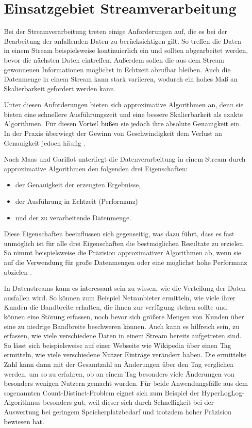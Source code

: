 \section{Einsatzgebiet Streamverarbeitung}
Bei der Streamverarbeitung treten einige Anforderungen auf, 
die es bei der Bearbeitung der anfallenden Daten zu berücksichtigen gilt. 
So treffen die Daten in einem Stream beispielsweise kontinuierlich ein 
und sollten abgearbeitet werden, bevor die nächsten Daten eintreffen. 
Außerdem sollen die aus dem Stream gewonnenen Informationen möglichst in Echtzeit abrufbar bleiben.
Auch die Datenmenge in einem Stream kann stark variieren, wodurch ein hohes Maß an Skalierbarkeit gefordert werden kann.

Unter diesen Anforderungen bieten sich approximative Algorithmen an, denn sie bieten eine schnellere Ausführungszeit und eine bessere Skalierbarkeit als exakte Algorithmen. 
Für diesen Vorteil büßen sie jedoch ihre absolute Genauigkeit ein. 
In der Praxis überwiegt der Gewinn von Geschwindigkeit dem Verlust an Genauigkeit jedoch häufig \cite{maas2019}. 

Nach Maas und Garillot \cite{maas2019} unterliegt die Datenverarbeitung in einem Stream durch approximative Algorithmen den folgenden drei Eigenschaften:  

\begin{itemize}
\item der Genauigkeit der erzeugten Ergebnisse,
\item der Ausführung in Echtzeit (Performanz)
\item und der zu verarbeitende Datenmenge.
\end{itemize}

Diese Eigenschaften beeinflussen sich gegenseitig, was dazu führt, 
dass es fast unmöglich ist für alle drei Eigenschaften die bestmöglichen Resultate zu erzielen.
So nimmt beispielsweise die Präzision approximativer Algorithmen ab, 
wenn sie auf die Verwendung für große Datenmengen oder eine möglichst hohe Performanz abzielen \cite{maas2019}.

In Datenstreams kann es interessant sein zu wissen, 
wie die Verteilung der Daten ausfallen wird. 
So können zum Beispiel Netzanbieter ermitteln, 
wie viele ihrer Kunden die Bandbreite erhalten, die ihnen zur verfügung stehen sollte 
und können eine Störung erfassen, 
noch bevor sich größere Mengen von Kunden über eine zu niedrige Bandbreite beschweren können.
Auch kann es hilfreich sein, zu erfassen, 
wie viele verschiedene Daten in einem Stream bereits aufgetreten sind. 
So lässt sich beispielsweise auf einer Webseite wie Wikipedia über einen Tag ermitteln, wie viele verschiedene Nutzer Einträge verändert haben.
Die ermittelte Zahl kann dann mit der Gesamtzahl an Änderungen über den Tag verglichen werden, 
um so zu erfahren, ob an einem Tag besonders viele Änderungen von besonders wenigen Nutzern gemacht wurden.
Für beide Anwendungsfälle aus dem sogenannten Count-Distinct-Problem eignet sich zum Beispiel der HyperLogLog-Algorithmus besonders gut, 
weil dieser sich durch Schnelligkeit bei der Auswertung 
bei geringem Speicherplatzbedarf und trotzdem hoher Präzision bewiesen hat.